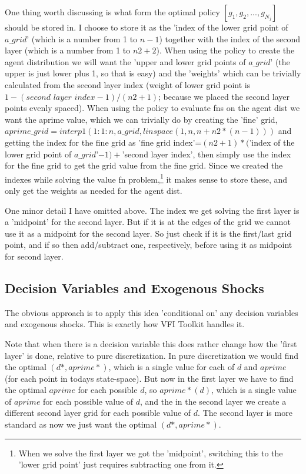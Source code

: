 \documentclass[11pt,fleqn]{article}
\begin{document}
One thing worth discussing is what form the optimal policy $[g_1,g_2,...,g_{N_j}]$ should be stored in. I choose to store it as the 'index of the lower grid point of $a\_{}grid$' (which is a number from 1 to $n-1$) together with the index of the second layer (which is a number from 1 to $n2+2$). When using the policy to create the agent distribution we will want the 'upper and lower grid points of $a\_{}grid$' (the upper is just lower plus 1, so that is easy) and the 'weights' which can be trivially calculated from the second layer index (weight of lower grid point is $1-(\textit{second layer index}-1)/(n2+1)$; because we placed the second layer points evenly spaced). When using the policy to evaluate fns on the agent dist we want the aprime value, which we can trivially do by creating the 'fine' grid, $aprime\_{}grid=interp1(1:1:n,a\_{}grid,linspace(1,n,n+n2*(n-1)))$ and getting the index for the fine grid as 'fine grid index'=$(n2+1)*($'index of the lower grid point of $a\_{}grid$'$ -1)+$'second layer index', then simply use the index for the fine grid to get the grid value from the fine grid. Since we created the indexes while solving the value fn problem,\footnote{When we solve the first layer we got the 'midpoint', switching this to the 'lower grid point' just requires subtracting one from it.} it makes sense to store these, and only get the weights as needed for the agent dist.

One minor detail I have omitted above. The index we get solving the first layer is a 'midpoint' for the second layer. But if it is at the edges of the grid we cannot use it as a midpoint for the second layer. So just check if it is the first/last grid point, and if so then add/subtract one, respectively, before using it as midpoint for second layer.

\subsection*{Decision Variables and Exogenous Shocks}
The obvious approach is to apply this idea 'conditional on' any decision variables and exogenous shocks. This is exactly how VFI Toolkit handles it.

Note that when there is a decision variable this does rather change how the 'first layer' is done, relative to pure discretization. In pure discretization we would find the optimal $(d*,aprime*)$, which is a single value for each of $d$ and $aprime$ (for each point in todays state-space). But now in the first layer we have to find the optimal $aprime$ for each possible $d$, so $aprime*(d)$, which is a single value of $aprime$ for each possible value of $d$, and the in the second layer we create a different second layer grid for each possible value of $d$. The second layer is more standard as now we just want the optimal $(d*,aprime*)$.
\end{document}
